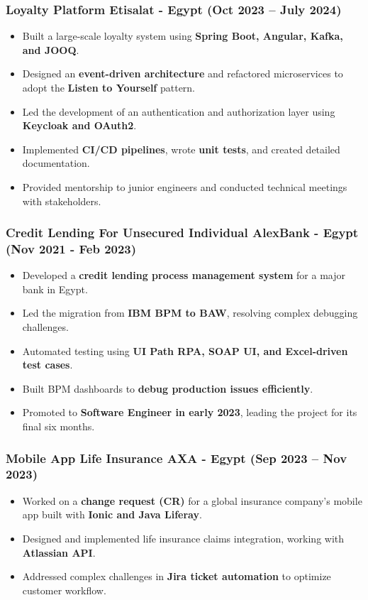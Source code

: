 \documentclass[a4paper,11pt]{article}
\begin{document}
{\subsubsection*{Loyalty Platform \textbar{} Etisalat - Egypt (Oct 2023 – July 2024)}
\begin{itemize}
    \item Built a large-scale loyalty system using \textbf{Spring Boot, Angular, Kafka, and JOOQ}.
    \item Designed an \textbf{event-driven architecture} and refactored microservices to adopt the \textbf{Listen to Yourself} pattern.
    \item Led the development of an authentication and authorization layer using \textbf{Keycloak and OAuth2}.
    \item Implemented \textbf{CI/CD pipelines}, wrote \textbf{unit tests}, and created detailed documentation.
    \item Provided mentorship to junior engineers and conducted technical meetings with stakeholders.

\end{itemize}


\subsubsection*{Credit Lending For Unsecured Individual \textbar{} AlexBank - Egypt (Nov 2021 - Feb 2023)}
\begin{itemize}
    \item Developed a \textbf{credit lending process management system} for a major bank in Egypt.
    \item Led the migration from \textbf{IBM BPM to BAW}, resolving complex debugging challenges.
    \item Automated testing using \textbf{UI Path RPA, SOAP UI, and Excel-driven test cases}.
    \item Built BPM dashboards to \textbf{debug production issues efficiently}.
    \item Promoted to \textbf{Software Engineer in early 2023}, leading the project for its final six months.
\end{itemize}

\subsubsection*{Mobile App Life Insurance \textbar{} AXA - Egypt (Sep 2023 – Nov 2023)}
\begin{itemize}
    \item Worked on a \textbf{change request (CR)} for a global insurance company's mobile app built with \textbf{Ionic and Java Liferay}.
    \item Designed and implemented life insurance claims integration, working with \textbf{Atlassian API}.
    \item Addressed complex challenges in \textbf{Jira ticket automation} to optimize customer workflow.
\end{itemize}

}
\end{document}
